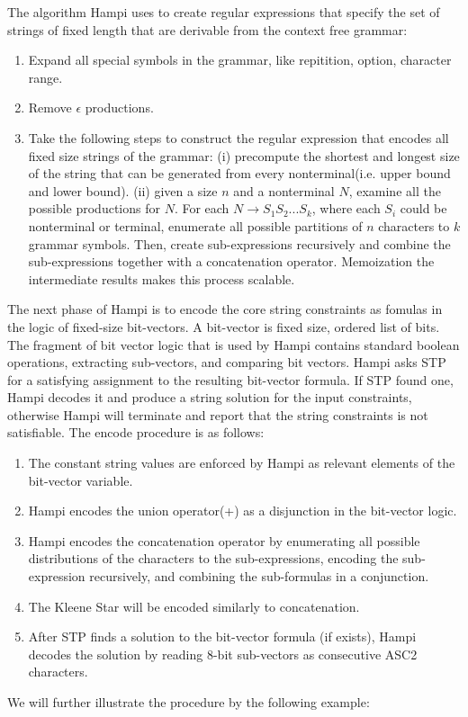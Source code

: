 The algorithm Hampi uses to create regular expressions that specify the set of strings of fixed length that are derivable from the context free grammar:
\begin{enumerate}
	\item Expand all special symbols in the grammar, like repitition, option, character range.
	\item Remove $\epsilon$ productions.
	\item Take the following steps to construct the regular expression that encodes all fixed size strings of the grammar: (i) precompute the shortest and longest size of the string that can be generated from every nonterminal(i.e. upper bound and lower bound). (ii) given a size $n$ and a nonterminal $N$, examine all the possible productions for $N$. For each $N\rightarrow S_1S_2...S_k$, where each $S_i$ could be nonterminal or terminal, enumerate all possible partitions of $n$ characters to $k$ grammar symbols. Then, create sub-expressions recursively and combine the sub-expressions together with a concatenation operator. Memoization the intermediate results makes this process scalable. 
\end{enumerate}   
The next phase of Hampi is to encode the core string constraints as fomulas in the logic of fixed-size bit-vectors. A bit-vector is fixed size, ordered list of bits. The fragment of bit vector logic that is used by Hampi contains standard boolean operations, extracting sub-vectors, and comparing bit vectors. Hampi asks STP for a satisfying assignment to the resulting bit-vector formula. If STP found one, Hampi decodes it and produce a string solution for the input constraints, otherwise Hampi will terminate and report that the string constraints is not satisfiable. The encode procedure is as follows:
\begin{enumerate}
	\item The constant string values are enforced by Hampi as relevant elements of the bit-vector variable.
	\item Hampi encodes the union operator(+) as a disjunction in the bit-vector logic.
	\item Hampi encodes the concatenation operator by enumerating all possible distributions of the characters to the sub-expressions, encoding the sub-expression recursively, and combining the sub-formulas in a conjunction.
	\item The Kleene Star will be encoded similarly to concatenation.
	\item After STP finds a solution to the bit-vector formula (if exists), Hampi decodes the solution by reading 8-bit sub-vectors as consecutive ASC2 characters.
\end{enumerate}
We will further illustrate the procedure by the following example:\\


